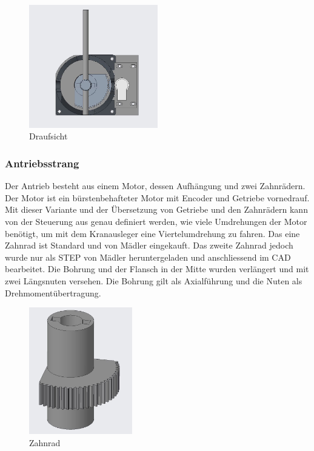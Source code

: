 \documentclass[../../main.tex]{subfiles}
\begin{document}
        \begin{figure}[H]
            \centering
            \includegraphics[width=0.5\textwidth]{../../images/Kran/Top.JPG}
            \caption {Draufsicht}
            \label{fig:et_komponenten}
        \end{figure}



    \subsubsection{Antriebsstrang}
        Der Antrieb besteht aus einem Motor, dessen Aufhängung und zwei Zahnrädern. Der Motor ist ein bürstenbehafteter Motor mit Encoder und Getriebe vornedrauf. Mit dieser Variante und der Übersetzung von Getriebe und den Zahnrädern kann von der Steuerung aus genau definiert werden, wie viele Umdrehungen der Motor benötigt, um mit dem Kranausleger eine Viertelumdrehung zu fahren. Das eine Zahnrad ist Standard und von Mädler eingekauft. Das zweite Zahnrad jedoch wurde nur als STEP von Mädler heruntergeladen und anschliessend im CAD bearbeitet. Die Bohrung und der Flansch in der Mitte wurden verlängert und mit zwei Längsnuten versehen. Die Bohrung gilt als Axialführung und die Nuten als Drehmomentübertragung.

        \begin{figure}[H]
            \centering
            \includegraphics[width=0.4\textwidth]{../../images/Kran/Zahnrad.JPG}
            \caption {Zahnrad}
            \label{fig:et_komponenten}
        \end{figure}
\end{document}
